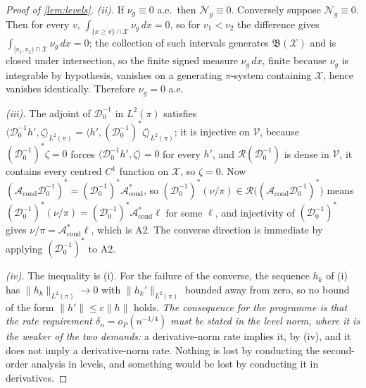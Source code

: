 \begin{proof}[Proof of \cref{lem:levels}]
\emph{(ii).} If $\nu_g\equiv0$ a.e.\ then $\mathcal N_g\equiv0$. Conversely suppose $\mathcal N_g\equiv0$.
Then for every $v$, $\int_{\{x\ge v\}\cap\mathcal X}\nu_g\,dx=0$, so for $v_1<v_2$ the difference gives
$\int_{[v_1,v_2)\cap\mathcal X}\nu_g\,dx=0$; the collection of such intervals generates
$\mathfrak B(\mathcal X)$ and is closed under intersection, so the finite signed measure $\nu_g\,dx$, finite
because $\nu_g$ is integrable by hypothesis, vanishes on a generating $\pi$-system containing
$\mathcal X$, hence vanishes identically. Therefore $\nu_g=0$ a.e.

\emph{(iii).} The adjoint of $\mathcal D^{-1}_0$ in $L^{2}(\pi)$ satisfies
$\langle\mathcal D^{-1}_0h',\zeta\rangle_{L^{2}(\pi)}=\langle h',(\mathcal D^{-1}_0)^{\ast}\zeta\rangle_{L^{2}(\pi)}$;
it is injective on $\mathcal V$, because $(\mathcal D^{-1}_0)^{\ast}\zeta=0$ forces
$\langle\mathcal D^{-1}_0h',\zeta\rangle=0$ for every $h'$, and $\mathcal R(\mathcal D^{-1}_0)$ is dense in
$\mathcal V$, it contains every centred $C^{1}$ function on $\mathcal X$, so $\zeta=0$. Now
$(\mathcal A_{\mathrm{cond}}\mathcal D^{-1}_0)^{\ast}=(\mathcal D^{-1}_0)^{\ast}\mathcal A^\ast_{\mathrm{cond}}$,
so
$(\mathcal D^{-1}_0)^{\ast}(\nu/\pi)\in\mathcal R\big((\mathcal A_{\mathrm{cond}}\mathcal D^{-1}_0)^{\ast}\big)$
means $(\mathcal D^{-1}_0)^{\ast}(\nu/\pi)=(\mathcal D^{-1}_0)^{\ast}\mathcal A^\ast_{\mathrm{cond}}\ell$
for some $\ell$, and injectivity of $(\mathcal D^{-1}_0)^{\ast}$ gives
$\nu/\pi=\mathcal A^\ast_{\mathrm{cond}}\ell$, which is A2. The converse direction is immediate by
applying $(\mathcal D^{-1}_0)^{\ast}$ to A2.

\emph{(iv).} The inequality is (i). For the failure of the converse, the sequence $h_k$ of (i) has
$\|h_k\|_{L^{2}(\pi)}\to0$ with $\|h_k'\|_{L^{2}(\pi)}$ bounded away from zero, so no bound of the form
$\|h'\|\le c\|h\|$ holds. \emph{The consequence for the programme is that the rate requirement
$\delta_n=o_P(n^{-1/4})$ must be stated in the level norm, where it is the weaker of the two demands:} a
derivative-norm rate implies it, by (iv), and it does not imply a derivative-norm rate. Nothing is lost
by conducting the second-order analysis in levels, and something would be lost by conducting it in
derivatives.
\end{proof}

